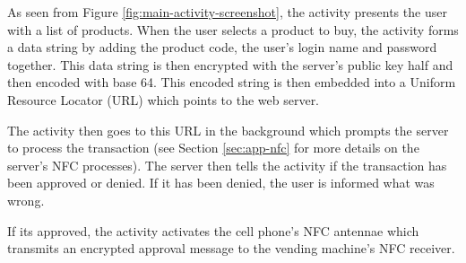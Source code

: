 As seen from Figure \ref{fig:main-activity-screenshot}, the activity presents
the user with a list of products. When the user selects a product to buy, the
activity forms a data string by adding the product code, the user's login
name and password together. This data string is then encrypted with the
server's public key half and then encoded with base 64. This encoded string
is then embedded into a Uniform Resource Locator (URL) which points to the
web server. 

The activity then goes to this URL in the background which prompts the server to
process the transaction (see Section \ref{sec:app-nfc} for more details on the
server's NFC processes). The server then tells the activity if the transaction
has been approved or denied. If it has been denied, the user is informed what was wrong. 

If its approved, the activity activates the cell phone's NFC antennae which
transmits an encrypted approval message to the vending machine's NFC receiver. 
